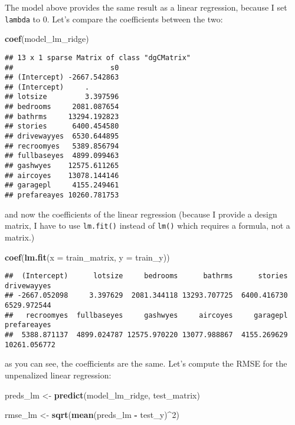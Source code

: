 \documentclass[
]{article}
\newenvironment{Shaded}{\begin{snugshade}}{\end{snugshade}}
\newcommand{\DataTypeTok}[1]{\textcolor[rgb]{0.13,0.29,0.53}{#1}}
\newcommand{\DecValTok}[1]{\textcolor[rgb]{0.00,0.00,0.81}{#1}}
\newcommand{\KeywordTok}[1]{\textcolor[rgb]{0.13,0.29,0.53}{\textbf{#1}}}
\newcommand{\NormalTok}[1]{#1}
\newcommand{\OperatorTok}[1]{\textcolor[rgb]{0.81,0.36,0.00}{\textbf{#1}}}
\newcommand{\StringTok}[1]{\textcolor[rgb]{0.31,0.60,0.02}{#1}}
\begin{document}
The model above provides the same result as a linear regression, because I set \texttt{lambda} to 0. Let's
compare the coefficients between the two:

\begin{Shaded}
\begin{Highlighting}[]
\KeywordTok{coef}\NormalTok{(model\_lm\_ridge)}
\end{Highlighting}
\end{Shaded}

\begin{verbatim}
## 13 x 1 sparse Matrix of class "dgCMatrix"
##                       s0
## (Intercept) -2667.542863
## (Intercept)     .       
## lotsize         3.397596
## bedrooms     2081.087654
## bathrms     13294.192823
## stories      6400.454580
## drivewayyes  6530.644895
## recroomyes   5389.856794
## fullbaseyes  4899.099463
## gashwyes    12575.611265
## aircoyes    13078.144146
## garagepl     4155.249461
## prefareayes 10260.781753
\end{verbatim}

and now the coefficients of the linear regression (because I provide a design matrix, I have to use
\texttt{lm.fit()} instead of \texttt{lm()} which requires a formula, not a matrix.)

\begin{Shaded}
\begin{Highlighting}[]
\KeywordTok{coef}\NormalTok{(}\KeywordTok{lm.fit}\NormalTok{(}\DataTypeTok{x =}\NormalTok{ train\_matrix, }\DataTypeTok{y =}\NormalTok{ train\_y))}
\end{Highlighting}
\end{Shaded}

\begin{verbatim}
##  (Intercept)      lotsize     bedrooms      bathrms      stories  drivewayyes 
## -2667.052098     3.397629  2081.344118 13293.707725  6400.416730  6529.972544 
##   recroomyes  fullbaseyes     gashwyes     aircoyes     garagepl  prefareayes 
##  5388.871137  4899.024787 12575.970220 13077.988867  4155.269629 10261.056772
\end{verbatim}

as you can see, the coefficients are the same. Let's compute the RMSE for the unpenalized linear
regression:

\begin{Shaded}
\begin{Highlighting}[]
\NormalTok{preds\_lm \textless{}{-}}\StringTok{ }\KeywordTok{predict}\NormalTok{(model\_lm\_ridge, test\_matrix)}

\NormalTok{rmse\_lm \textless{}{-}}\StringTok{ }\KeywordTok{sqrt}\NormalTok{(}\KeywordTok{mean}\NormalTok{(preds\_lm }\OperatorTok{{-}}\StringTok{ }\NormalTok{test\_y)}\OperatorTok{\^{}}\DecValTok{2}\NormalTok{)}
\end{Highlighting}
\end{Shaded}
\end{document}
